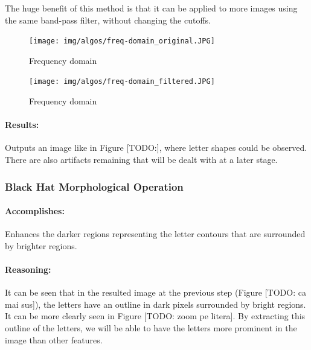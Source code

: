 The huge benefit of this method is that it can be applied to more images using the same band-pass filter, without changing the cutoffs.

\begin{figure}
        \centering
        \begin{minipage}[c]{0.4\linewidth}
        \centering
        \texttt{[image: img/algos/freq-domain\_original.JPG]}
        \caption{Frequency domain}
        \label{fig:freq-domain-original}
    \end{minipage}
    \begin{minipage}[c]{0.4\linewidth}
        \centering
        \texttt{[image: img/algos/freq-domain\_filtered.JPG]}
        \caption{Frequency domain}
        \label{fig:freq-domain-filtered}
    \end{minipage}
\end{figure}

\paragraph*{Results:}\mbox{}\par
Outputs an image like in Figure [TODO:], where letter shapes could be observed. There are also artifacts remaining that will be dealt with at a later stage.

\subsubsection{Black Hat Morphological Operation}
\label{subsubsec:bh-morpho-op}

\paragraph*{Accomplishes:}\mbox{}\par
Enhances the darker regions representing the letter contours that are surrounded by brighter regions.

\paragraph*{Reasoning:}\mbox{}\par
It can be seen that in the resulted image at the previous step (Figure [TODO: ca mai sus]), the letters have an outline in dark pixels surrounded by bright regions. It can be more clearly seen in Figure [TODO: zoom pe litera]. By extracting this outline of the letters, we will be able to have the letters more prominent in the image than other features.

